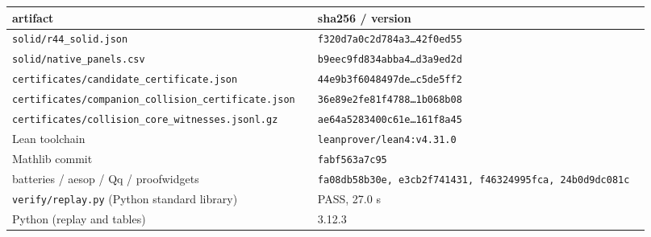 \begin{tabular}{L{0.42\linewidth} L{0.5\linewidth}}
\toprule
artifact & sha256 / version \\
\midrule
\texttt{solid/\allowbreak{}\allowbreak{}r44\_\allowbreak{}solid.json} & \texttt{f320d7a0c2d784a3\dots{}42f0ed55} \\
\texttt{solid/\allowbreak{}\allowbreak{}native\_\allowbreak{}panels.csv} & \texttt{b9eec9fd834abba4\dots{}d3a9ed2d} \\
\texttt{certificates/\allowbreak{}\allowbreak{}candidate\_\allowbreak{}certificate.json} & \texttt{44e9b3f6048497de\dots{}c5de5ff2} \\
\texttt{certificates/\allowbreak{}\allowbreak{}companion\_\allowbreak{}collision\_\allowbreak{}certificate.json} & \texttt{36e89e2fe81f4788\dots{}1b068b08} \\
\texttt{certificates/\allowbreak{}\allowbreak{}collision\_\allowbreak{}core\_\allowbreak{}witnesses.jsonl.gz} & \texttt{ae64a5283400c61e\dots{}161f8a45} \\
Lean toolchain & \texttt{leanprover/\allowbreak{}lean4:v4.31.0} \\
Mathlib commit & \texttt{fabf563a7c95} \\
batteries / aesop / Qq / proofwidgets & \texttt{fa08db58b30e, e3cb2f741431, f46324995fca, 24b0d9dc081c} \\
\texttt{verify/\allowbreak{}\allowbreak{}replay.py} (Python standard library) & PASS, 27.0 s \\
Python (replay and tables) & 3.12.3 \\
\bottomrule
\end{tabular}
